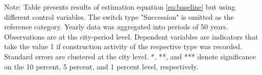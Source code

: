 \begin{table}[htbp]
\begin{tabular}{lcccc}
      
   \end{tabular}
   
   \par \raggedright 
   Note: Table presents results of estimation equation \eqref{eq:baseline} but using different control variables. The switch type  "Succession" is omitted as the reference category. Yearly data was aggregated into periods of 50 years. Observations are at the city-period level. Dependent variables are indicators  that take the value 1 if construction activity of the respective type was  recorded. Standard errors are clustered at the city level. *, **, and *** denote significance on the 10 percent, 5 percent, and 1 percent  level, respectively.
\end{table}
